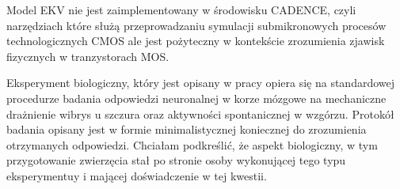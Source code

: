 \begin{frame}[t]
    \begin{block}{\tb}
    \end{block}


    Model EKV nie jest zaimplementowany w środowisku CADENCE, czyli narzędziach które służą przeprowadzaniu symulacji submikronowych procesów technologicznych CMOS ale jest pożyteczny w kontekście zrozumienia zjawisk fizycznych w tranzystorach MOS. 

    \begin{block}{\tb}
    \end{block}
    Eksperyment biologiczny, który jest opisany w pracy opiera się na standardowej procedurze badania odpowiedzi neuronalnej w korze mózgowe na mechaniczne drażnienie wibrys u szczura oraz aktywności spontanicznej w wzgórzu. Protokół badania opisany jest w formie minimalistycznej koniecznej do zrozumienia otrzymanych odpowiedzi. Chciałam podkreślić, że aspekt biologiczny, w tym przygotowanie zwierzęcia stał po stronie osoby wykonującej tego typu eksperymentuy i mającej doświadczenie w tej kwestii.


\end{frame}

